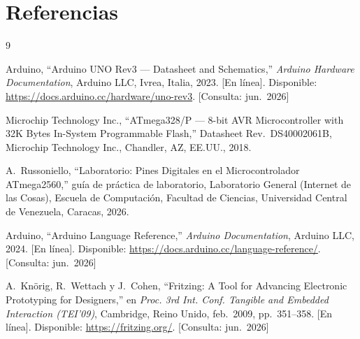 \section{Referencias}
\begingroup
\small
\begin{thebibliography}{9}

Arduino, ``Arduino UNO Rev3 --- Datasheet and Schematics,''
\emph{Arduino Hardware Documentation}, Arduino LLC, Ivrea, Italia, 2023.
[En línea]. Disponible: \url{https://docs.arduino.cc/hardware/uno-rev3}.
[Consulta: jun.~2026]

Microchip Technology Inc., ``ATmega328/P --- 8-bit AVR Microcontroller with
32K Bytes In-System Programmable Flash,'' Datasheet Rev.~DS40002061B,
Microchip Technology Inc., Chandler, AZ, EE.UU., 2018.

A.~Russoniello, ``Laboratorio: Pines Digitales en el Microcontrolador
ATmega2560,'' guía de práctica de laboratorio, Laboratorio General
(Internet de las Cosas), Escuela de Computación, Facultad de Ciencias,
Universidad Central de Venezuela, Caracas, 2026.

Arduino, ``Arduino Language Reference,'' \emph{Arduino Documentation},
Arduino LLC, 2024. [En línea]. Disponible:
\url{https://docs.arduino.cc/language-reference/}. [Consulta: jun.~2026]

A.~Knörig, R.~Wettach y J.~Cohen, ``Fritzing: A Tool for Advancing
Electronic Prototyping for Designers,'' en \emph{Proc. 3rd Int. Conf.
Tangible and Embedded Interaction (TEI'09)}, Cambridge, Reino Unido,
feb.~2009, pp.~351--358. [En línea]. Disponible: \url{https://fritzing.org/}.
[Consulta: jun.~2026]

\end{thebibliography}
\endgroup

